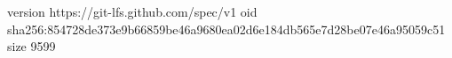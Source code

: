 version https://git-lfs.github.com/spec/v1
oid sha256:854728de373e9b66859be46a9680ea02d6e184db565e7d28be07e46a95059c51
size 9599
